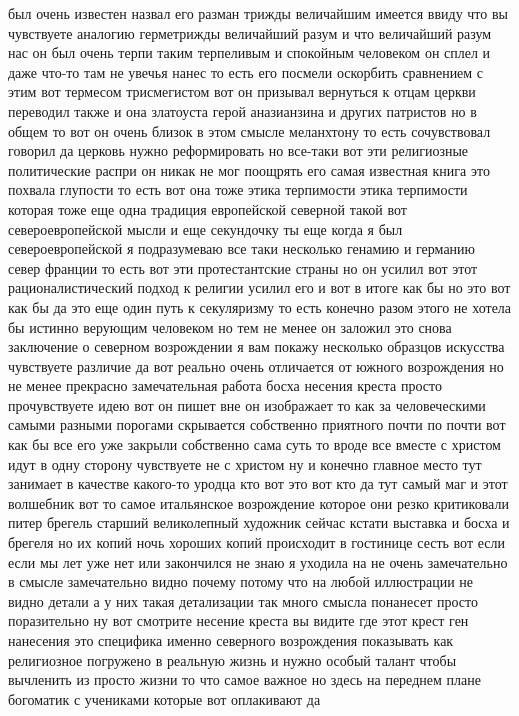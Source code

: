 был очень известен назвал его разман трижды величайшим имеется ввиду что вы
чувствуете аналогию герметрижды величайший разум и что величайший разум нас он
был очень терпи таким терпеливым и спокойным человеком он сплел и даже что-то
там не увечья нанес то есть его посмели оскорбить сравнением с этим вот термесом
трисмегистом вот он призывал вернуться к отцам церкви переводил также и она
златоуста герой аназианзина и других патристов но в общем то вот он очень близок
в этом смысле меланхтону то есть сочувствовал говорил да церковь нужно
реформировать но все-таки вот эти религиозные политические распри он никак не
мог поощрять его самая известная книга это похвала глупости то есть вот она тоже
этика терпимости этика терпимости которая тоже еще одна традиция европейской
северной такой вот североевропейской мысли и еще секундочку ты еще когда я был
североевропейской я подразумеваю все таки несколько генамию и германию север
франции то есть вот эти протестантские страны но он усилил вот этот
рационалистический подход к религии усилил его и вот в итоге как бы но это вот
как бы да это еще один путь к секуляризму то есть конечно разом этого не хотела
бы истинно верующим человеком но тем не менее он заложил это снова заключение о
северном возрождении я вам покажу несколько образцов искусства чувствуете
различие да вот реально очень отличается от южного возрождения но не менее
прекрасно замечательная работа босха несения креста просто прочувствуете идею
вот он пишет вне он изображает то как за человеческими самыми разными порогами
скрывается собственно приятного почти по почти вот как бы все его уже закрыли
собственно сама суть то вроде все вместе с христом идут в одну сторону
чувствуете не с христом ну и конечно главное место тут занимает в качестве
какого-то уродца кто вот это вот кто да тут самый маг и этот волшебник вот то
самое итальянское возрождение которое они резко критиковали питер брегель
старший великолепный художник сейчас кстати выставка и босха и брегеля но их
копий ночь хороших копий происходит в гостинице сесть вот если если мы лет уже
нет или закончился не знаю я уходила на не очень замечательно в смысле
замечательно видно почему потому что на любой иллюстрации не видно детали а у
них такая детализации так много смысла понанесет просто поразительно ну вот
смотрите несение креста вы видите где этот крест ген нанесения это специфика
именно северного возрождения показывать как религиозное погружено в реальную
жизнь и нужно особый талант чтобы вычленить из просто жизни то что самое важное
но здесь на переднем плане богоматик с учениками которые вот оплакивают да
